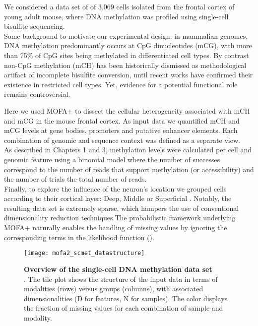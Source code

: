 We considered a data set of of 3,069 cells isolated from the frontal cortex of young adult mouse, where DNA methylation was profiled using single-cell bisulfite sequencing\cite{Luo2018}.\\Some background to motivate our experimental design: in mammalian genomes, DNA methylation predominantly occurs at CpG dinucleotides (mCG), with more than 75\% of CpG sites being methylated in differentiated cell types. By contrast non-CpG methylation (mCH) has been historically dismissed as methodological artifact of incomplete bisulfite conversion, until recent works have confirmed their existence in restricted cell types. Yet, evidence for a potential functional role remains controversial\cite{He2015}.

Here we used MOFA+ to dissect the cellular heterogeneity associated with mCH and mCG in the mouse frontal cortex. As input data we quantified mCH and mCG levels at gene bodies, promoters and putative enhancer elements. Each combination of genomic and sequence context was defined as a separate view.\\
As described in Chapters 1 and 3, methylation levels were calculated per cell and genomic feature using a binomial model where the number of successes correspond to the number of reads that support methylation (or accessibility) and the number of trials the total number of reads.\\
Finally, to explore the influence of the neuron's location we grouped cells according to their cortical layer: Deep, Middle or Superficial \cite{Luo2017}. Notably, the resulting data set is extremely sparse, which hampers the use of conventional dimensionality reduction techniques.The probabilistic framework underlying MOFA+ naturally enables the handling of missing values by ignoring the corresponding terms in the likelihood function ().

\begin{figure}[H]
	\centering
	\texttt{[image: mofa2\_scmet\_datastructure]}
	\caption[]{\textbf{Overview of the single-cell DNA methylation data set}\\. 
	The tile plot shows the structure of the input data in terms of modalities (rows) versus groups (columns), with associated dimensionalities (D for features, N for samples). The color displays the fraction of missing values for each combination of sample and modality.}
	\label{fig:mofa2_scmet_datastructure}
\end{figure}


